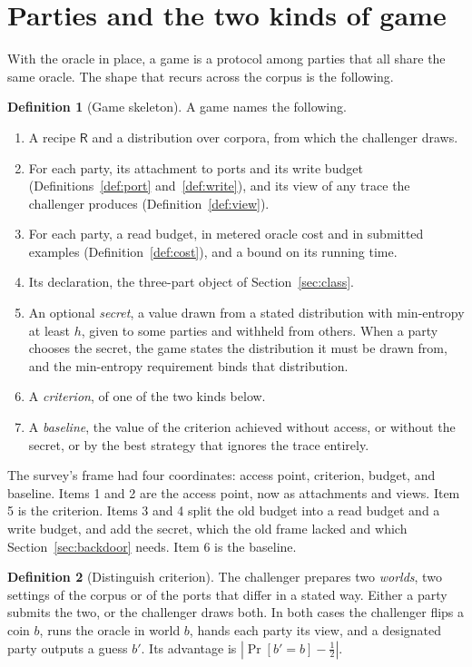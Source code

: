 \documentclass[11pt]{article}
\theoremstyle{definition}
\newtheorem{definition}{Definition}
\theoremstyle{plain}
\theoremstyle{remark}
\newcommand{\Rec}{\mathsf{R}}
\begin{document}
\section{Parties and the two kinds of game}
\label{sec:games}

With the oracle in place, a game is a protocol among parties that all share the
same oracle. The shape that recurs across the corpus is the following.

\begin{definition}[Game skeleton]
\label{def:skeleton}
A game names the following.
\begin{enumerate}
  \item A recipe $\Rec$ and a distribution over corpora, from which the challenger
        draws.
  \item For each party, its attachment to ports and its write budget
        (Definitions~\ref{def:port} and~\ref{def:write}), and its view of any trace
        the challenger produces (Definition~\ref{def:view}).
  \item For each party, a read budget, in metered oracle cost and in submitted
        examples (Definition~\ref{def:cost}), and a bound on its running time.
  \item Its declaration, the three-part object of Section~\ref{sec:class}.
  \item An optional \emph{secret}, a value drawn from a stated distribution with
        min-entropy at least $h$, given to some parties and withheld from others.
        When a party chooses the secret, the game states the distribution it must
        be drawn from, and the min-entropy requirement binds that distribution.
  \item A \emph{criterion}, of one of the two kinds below.
  \item A \emph{baseline}, the value of the criterion achieved without access, or
        without the secret, or by the best strategy that ignores the trace
        entirely.
\end{enumerate}
\end{definition}

The survey's frame had four coordinates: access point, criterion, budget, and
baseline. Items 1 and 2 are the access point, now as attachments and views. Item 5
is the criterion. Items 3 and 4 split the old budget into a read budget and a write
budget, and add the secret, which the old frame lacked and which
Section~\ref{sec:backdoor} needs. Item 6 is the baseline.

\begin{definition}[Distinguish criterion]
\label{def:dist}
The challenger prepares two \emph{worlds}, two settings of the corpus or of the
ports that differ in a stated way. Either a party submits the two, or the challenger draws both. In both cases the
challenger flips a coin $b$, runs the oracle in world $b$, hands each party its
view, and a designated party outputs a guess $b'$. Its advantage is $|\Pr[b'=b]-\tfrac12|$.
\end{definition}
\end{document}
